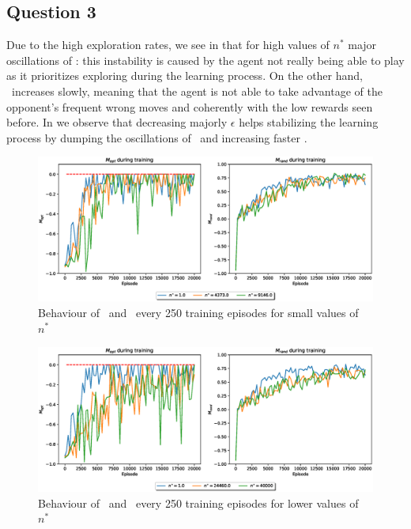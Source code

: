 \documentclass[10pt]{IEEEtran}
\begin{document}
\subsection*{Question 3}
Due to the high exploration rates, we see in  that for high values of $n^{*}$ major oscillations of \mopt: this instability is caused by the agent not really being able to play as it prioritizes exploring during the learning process. On the other hand, \mrand\  increases slowly, meaning that the agent is not able to take advantage of the opponent's frequent wrong moves and coherently with the low rewards seen before. In  we observe that decreasing majorly $\epsilon$ helps stabilizing the learning process by dumping the oscillations of \mopt\  and increasing faster \mrand.

\begin{figure}[H]
    \centering
    \includegraphics[width=\linewidth]{code/figures/performance_n_star_second.eps}
    \caption{Behaviour of \mopt\  and \mrand\  every 250 training episodes for small values of $n^{*}$}
    \label{firstplot_question3}
\end{figure}
\begin{figure}[H]
    \centering
    \includegraphics[width=\linewidth]{code/figures/performance_n_star_first.eps}
    \caption{Behaviour of \mopt\  and \mrand\  every 250 training episodes for lower values of $n^{*}$}
    \label{secondplot_question3}
\end{figure}
\end{document}
